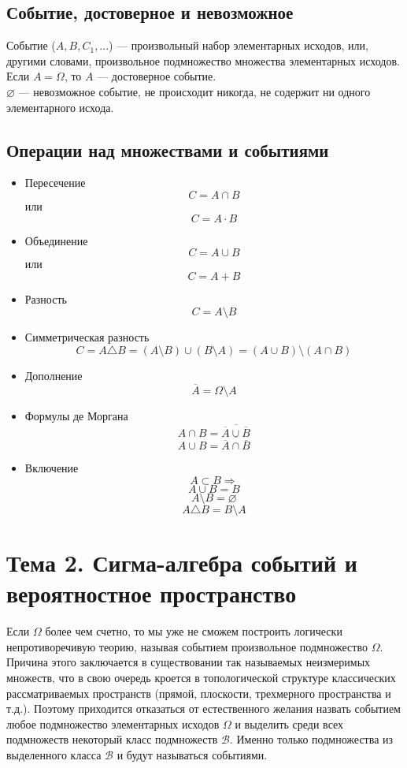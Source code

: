 \documentclass[12pt]{article}
\begin{document}
\subsection{Событие, достоверное и невозможное}
Событие ($A, B, C_1, ... $) --- произвольный набор элементарных исходов,
или, другими словами, произвольное подмножество множества элементарных исходов. \\
Если $A = \Omega$, то $A$ --- достоверное событие. \\
$\varnothing$ --- невозможное событие, не происходит никогда, не содержит ни одного элементарного исхода.

\subsection{Операции над множествами и событиями}
\begin{itemize}
	\item Пересечение \\
	      \[C = A \cap B\]
	      или
	      \[C = A \cdot B\]
	\item Объединение \\
	      \[C = A \cup B\]
	      или
	      \[C = A + B\]
	\item Разность \\
	      \[C = A \setminus B\]
	\item Симметрическая разность \\
	      \[C = A \triangle B = (A \setminus B) \cup (B \setminus A) = (A \cup B) \setminus (A \cap B)\]
	\item Дополнение \\
	      \[\overline{A} = \Omega \setminus A\]
	\item Формулы де Моргана \\
	      \[A \cap B = \overline{\overline{A} \cup \overline{B}}\]
	      \[A \cup B = \overline{\overline{A} \cap \overline{B}}\]
	\item Включение \\
	      \[A \subset B \Rightarrow\]
	      \[A \cup B = B\]
	      \[A \setminus B = \varnothing\]
	      \[A \triangle B = B \setminus A\]
\end{itemize}

\section{Тема 2. Сигма-алгебра событий и вероятностное пространство}
Если $\Omega$ более чем счетно, то мы уже не сможем построить логически непротиворечивую теорию,
называя событием произвольное подмножество $\Omega$.
Причина этого заключается в существовании так называемых неизмеримых множеств,
что в свою очередь кроется в топологической структуре классических рассматриваемых пространств
(прямой, плоскости, трехмерного пространства и т.д.).
Поэтому приходится отказаться от естественного желания назвать событием любое
подмножество элементарных исходов $\Omega$
и выделить среди всех подмножеств некоторый класс подмножеств $\mathcal{B}$.
Именно только подмножества из выделенного класса $\mathcal{B}$ и будут называться событиями.
\end{document}
